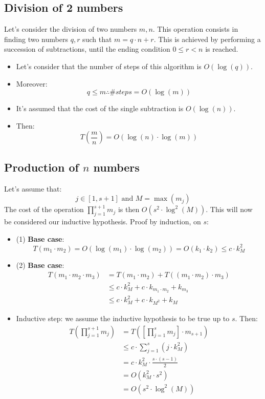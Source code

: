 \subsection{Division of 2 numbers}
Let's consider the division of two numbers $m, n$. This operation consists in \\ finding two numbers $q, r$ such that $m = q \cdot n + r$. \newline
This is achieved by performing a succession of subtractions, until the ending condition $0 \leq r < n$ is reached. \newline
\begin{itemize}
    \item Let's consider that the number of steps of this algorithm is $O(\operatorname{log}(q))$.
    \item Moreover: \[q \leq m \therefore \#steps = O(\operatorname{log}(m))\]
    \item It's assumed that the cost of the single subtraction is $O(\operatorname{log}(n))$.
    \item Then: \[T(\frac{m}{n}) = O(\operatorname{log}(n) \cdot \operatorname{log}(m))\]
\end{itemize}

\subsection{Production of $n$ numbers}
Let's assume that: \[j \in [1, s+1] \text{ and } M = \operatorname{max}(m_{j})\]
The cost of the operation $\prod_{j = 1}^{s+1} m_{j}$ is then $O(s^{2} \cdot \operatorname{log}^{2}(M))$. This will now be considered our inductive hypothesis.\newline
Proof by induction, on $s$:
\begin{itemize}
    \item (1) \textbf{Base case}: \[T(m_{1} \cdot m_{2}) = O(\operatorname{log}(m_{1}) \cdot \operatorname{log}(m_{2})) = O(k_{1} \cdot k_{2}) \leq c \cdot k_{M}^{2}\]
    \item (2) \textbf{Base case}:
    \begin{align*}
        T(m_{1} \cdot m_{2} \cdot m_{3}) & = T(m_{1} \cdot m_{2}) + T((m_{1} \cdot m_{2}) \cdot m_{3}) \\
        & \leq c \cdot k_{M}^{2} + c \cdot k_{m_{1} \cdot m_{2}} + k_{m_{3}} \\
        & \leq c \cdot k_{M}^{2} + c \cdot k_{M^{2}} + k_{M}
    \end{align*}
    \item Inductive step: we assume the inductive hypothesis to be true up to $s$. Then:
    \begin{align*}
        T(\prod_{j = 1}^{s+1} m_{j}) & = T([\prod_{j = 1}^{s} m_{j}] \cdot m_{s+1}) \\
        & \leq c \cdot \sum_{j=1}^{s} (j \cdot k_{M}^{2}) \\
        & = c \cdot k_{M}^{2} \cdot \frac{s \cdot (s-1)}{2} \\
        & = O(k_{M}^{2} \cdot s^{2}) \\
        & = O(s^{2} \cdot \operatorname{log}^{2}(M)) \\
    \end{align*}
\end{itemize}
